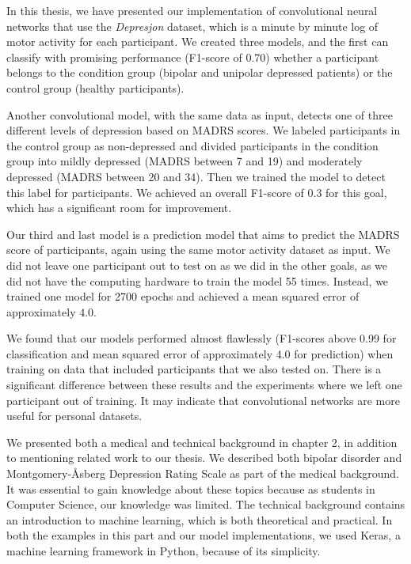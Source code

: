 In this thesis, we have presented our implementation of convolutional neural networks that use the \textit{Depresjon} dataset, which is a minute by minute log of motor activity for each participant. We created three models, and the first can classify with promising performance (F1-score of 0.70) whether a participant belongs to the condition group (bipolar and unipolar depressed patients) or the control group (healthy participants). 

Another convolutional model, with the same data as input, detects one of three different levels of depression based on MADRS scores. We labeled participants in the control group as non-depressed and divided participants in the condition group into mildly depressed (MADRS between 7 and 19) and moderately depressed (MADRS between 20 and 34). Then we trained the model to detect this label for participants. We achieved an overall F1-score of 0.3 for this goal, which has a significant room for improvement.  

Our third and last model is a prediction model that aims to predict the MADRS score of participants, again using the same motor activity dataset as input. We did not leave one participant out to test on as we did in the other goals, as we did not have the computing hardware to train the model 55 times. Instead, we trained one model for 2700 epochs and achieved a mean squared error of approximately 4.0. 

We found that our models performed almost flawlessly (F1-scores above 0.99 for classification and mean squared error of approximately 4.0 for prediction) when training on data that included participants that we also tested on. There is a significant difference between these results and the experiments where we left one participant out of training. It may indicate that convolutional networks are more useful for personal datasets. 

We presented both a medical and technical background in chapter 2, in addition to mentioning related work to our thesis. We described both bipolar disorder and Montgomery-Åsberg Depression Rating Scale as part of the medical background. It was essential to gain knowledge about these topics because as students in Computer Science, our knowledge was limited. The technical background contains an introduction to machine learning, which is both theoretical and practical. In both the examples in this part and our model implementations, we used Keras, a machine learning framework in Python, because of its simplicity. 

